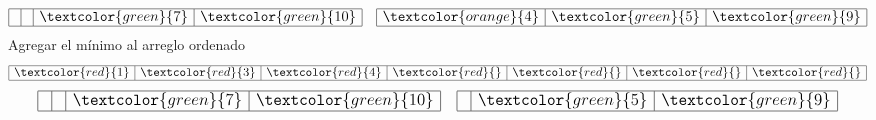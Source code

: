 \documentclass{article}
\begin{document}
\begin{minipage}{0.5\textwidth}
\begin{equation*}
\begin{array}{|r|r|r|r|r|r|r|}
    \end{array}
  \end{equation*}
  \begin{equation*}
    \large
    \begin{array}{|r|r|r|r|}
      \hline & & \textcolor{green}{7} & \textcolor{green}{10} \\ \hline
    \end{array}\quad 
    \begin{array}{|r|r|r|}
      \hline \textcolor{orange}{4} & \textcolor{green}{5} & \textcolor{green}{9} \\ \hline
    \end{array}
  \end{equation*}
  Agregar el mínimo al arreglo ordenado
  \begin{equation*}
    \large
    \begin{array}{|r|r|r|r|r|r|r|}
      \hline \textcolor{red}{1} & \textcolor{red}{3} & \textcolor{red}{4} & \textcolor{red}{} & \textcolor{red}{} & \textcolor{red}{} & \textcolor{red}{} \\ \hline
    \end{array}
  \end{equation*}
  \begin{equation*}
    \large
    \begin{array}{|r|r|r|r|}
      \hline & & \textcolor{green}{7} & \textcolor{green}{10} \\ \hline
    \end{array}\quad 
    \begin{array}{|r|r|r|}
      \hline & \textcolor{green}{5} & \textcolor{green}{9} \\ \hline
    \end{array}
  \end{equation*}
\end{minipage}
\end{document}
